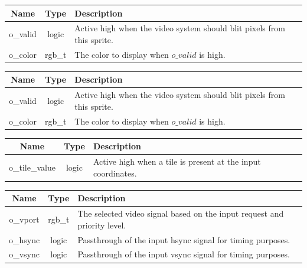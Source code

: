 \documentclass[12pt]{article}
\begin{document}
\vspace{0.5in}
\begingroup
{}
\label{tab:output_becman_sprite}
\begin{tabularx}{\linewidth}{ ||c|c|X|| }
    \hline
    Name & Type & Description \\
    \hline
    o\_valid & logic & Active high when the video system should blit pixels from
    this sprite. \\
    o\_color & rgb\_t & The color to display when $o\_valid$ is high. \\
    \hline
\end{tabularx}
\endgroup

\vspace{0.5in}
\begingroup
{}
\label{tab:output_map_sprite}
\begin{tabularx}{\linewidth}{ ||c|c|X|| }
    \hline
    Name & Type & Description \\
    \hline
    o\_valid & logic & Active high when the video system should blit pixels from
    this sprite. \\
    o\_color & rgb\_t & The color to display when $o\_valid$ is high. \\    
    \hline
\end{tabularx}
\endgroup

\newpage
\begingroup
{}
\label{tab:output_map_ram}
\begin{tabularx}{\linewidth}{ ||c|c|X|| }
    \hline
    Name & Type & Description \\
    \hline
    o\_tile\_value & logic & Active high when a tile is present at the input
    coordinates. \\
    \hline
\end{tabularx}
\endgroup

\vspace{0.5in}
\begingroup
{}
\label{tab:output_video_arbiter}
\begin{tabularx}{\linewidth}{ ||c|c|X|| }
    \hline
    Name & Type & Description \\
    \hline
    o\_vport & rgb\_t & The selected video signal based on the input request and
    priority level. \\
    o\_hsync & logic & Passthrough of the input hsync signal for timing
    purposes. \\
    o\_vsync & logic & Passthrough of the input vsync signal for timing purposes. \\
    \hline
\end{tabularx}
\endgroup
\end{document}
